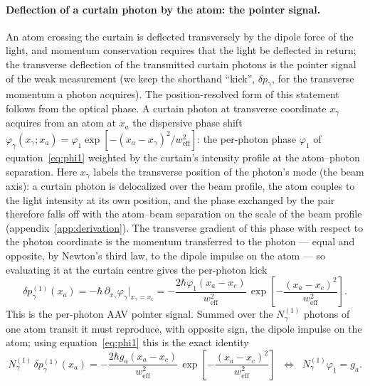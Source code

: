 \documentclass[11pt,a4paper]{article}
\begin{document}
\paragraph{Deflection of a curtain photon by the atom: the pointer signal.}
An atom crossing the curtain is deflected transversely by the dipole force of the light, and momentum conservation requires that the light be deflected in return; the transverse deflection of the transmitted curtain photons is the pointer signal of the weak measurement (we keep the shorthand ``kick'', $\delta p_\gamma$, for the transverse momentum a photon acquires). The position-resolved form of this statement follows from the optical phase. A curtain photon at transverse coordinate $x_\gamma$ acquires from an atom at $x_a$ the dispersive phase shift $\varphi_\gamma(x_\gamma; x_a) = \varphi_1 \exp[-(x_a - x_\gamma)^2/w_\text{eff}^2]$: the per-photon phase $\varphi_1$ of equation~\eqref{eq:phi1} weighted by the curtain's intensity profile at the atom--photon separation. Here $x_\gamma$ labels the transverse position of the photon's mode (the beam axis): a curtain photon is delocalized over the beam profile, the atom couples to the light intensity at its own position, and the phase exchanged by the pair therefore falls off with the atom--beam separation on the scale of the beam profile (appendix~\ref{app:derivation}). The transverse gradient of this phase with respect to the photon coordinate is the momentum transferred to the photon --- equal and opposite, by Newton's third law, to the dipole impulse on the atom --- so evaluating it at the curtain centre gives the per-photon kick
\begin{equation}
\delta p_\gamma^{(1)}(x_a) = -\hbar\,\partial_{x_\gamma}\varphi_\gamma\big|_{x_\gamma = x_c}
= -\frac{2\hbar \varphi_1 (x_a - x_c)}{w_\text{eff}^2}\,\exp\!\left[-\frac{(x_a - x_c)^2}{w_\text{eff}^2}\right].
\label{eq:photon_kick}
\end{equation}
This is the per-photon AAV pointer signal. Summed over the $N_\gamma^{(1)}$ photons of one atom transit it must reproduce, with opposite sign, the dipole impulse on the atom; using equation~\eqref{eq:phi1} this is the exact identity
\begin{equation}
N_\gamma^{(1)}\,\delta p_\gamma^{(1)}(x_a) = -\frac{2\hbar g_a (x_a - x_c)}{w_\text{eff}^2}\,\exp\!\left[-\frac{(x_a - x_c)^2}{w_\text{eff}^2}\right]
\;\;\Longleftrightarrow\;\; N_\gamma^{(1)}\varphi_1 = g_a.
\label{eq:momentum_identity}
\end{equation}
\end{document}

